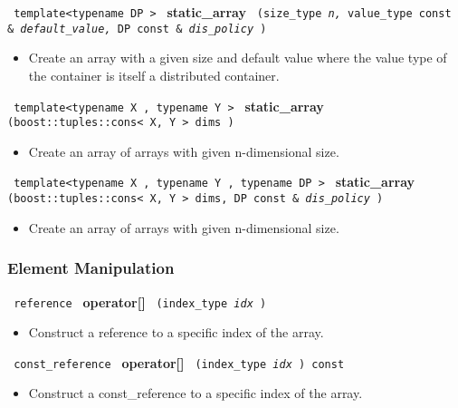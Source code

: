 \noindent
\texttt{%
template<typename DP >
}
\newline
\textbf{static\_array}%
\texttt{%
(size\_type 
\textit{n,}%
value\_type const \&
\textit{default\_value,}%
DP const \&
\textit{dis\_policy}%
)
}

\begin{itemize}
\item
Create an array with a given size and default value where the value type of the container is itself a distributed container. 
\end{itemize}
 
\noindent
\texttt{%
template<typename X , typename Y >
}
\newline
\textbf{static\_array}%
\texttt{%
(boost::tuples::cons< X, Y > dims
)
}

\begin{itemize}
\item
Create an array of arrays with given n-dimensional size. 
\end{itemize}
 
\noindent
\texttt{%
template<typename X , typename Y , typename DP >
}
\newline
\textbf{static\_array}%
\texttt{%
(boost::tuples::cons< X, Y > dims, DP const \&
\textit{dis\_policy}%
)
}

\begin{itemize}
\item
Create an array of arrays with given n-dimensional size. 
\end{itemize}

\subsubsection{Element Manipulation}

\noindent
\texttt{%
reference
}
\textbf{operator[]}%
\texttt{%
(index\_type 
\textit{idx}%
)
}

\begin{itemize}
\item
Construct a reference to a specific index of the array.
\end{itemize}
 
\noindent%
\texttt{%
const\_reference
}
\textbf{operator[]}%
\texttt{%
(index\_type 
\textit{idx}%
) const
}

\begin{itemize}
\item
Construct a const\_reference to a specific index of the array.
\end{itemize}
 
